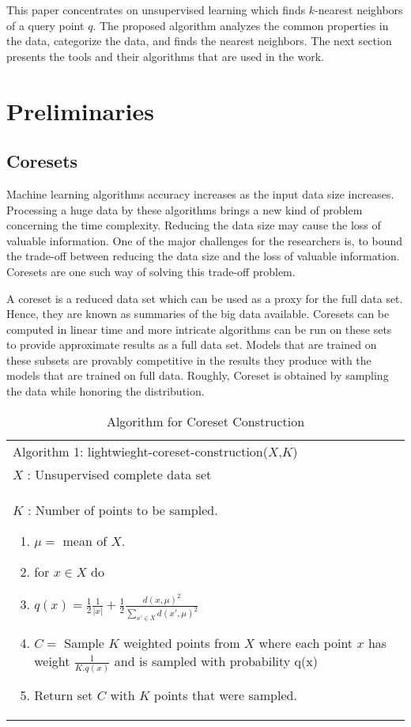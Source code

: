 \documentclass[runningheads]{llncs}
\begin{document}
This paper concentrates on unsupervised learning which finds $k$-nearest neighbors\cite{J.L.Bentley1} of a query point $q$.   The proposed algorithm analyzes the common properties in the data, categorize the data, and finds the nearest neighbors. The next section presents the tools and their algorithms that are used in the work.

\section{Preliminaries}
\label{sec:2}
\subsection{Coresets}
\label{subsec:1}
Machine learning algorithms accuracy increases as the input data size increases. Processing a huge data by these algorithms brings a new kind of problem concerning the time complexity. Reducing the data size may cause the loss of valuable information. One of the major challenges for the researchers is, to bound the trade-off between reducing the data size and the loss of valuable information. Coresets are one such way of solving this trade-off problem.

A coreset is a reduced data set which can be used as a proxy for the full data set. Hence, they are known as summaries of the big data available\cite{Olivier Bachem}. Coresets can be computed in linear time and more intricate algorithms can be run on these sets to provide approximate results as a full data set. Models that are trained on these subsets are provably competitive in the results they produce with the models that are trained on full data. Roughly, Coreset is obtained by sampling the data while honoring the distribution.

\begin{table}[!hbt]
	\caption{Algorithm for Coreset Construction}
	\label{tab:1}   
	\begin{tabular}{p{11cm}}
		\hline\noalign{\smallskip}
		Algorithm 1: lightwieght-coreset-construction($X$,$K$)\\
		\noalign{\smallskip}\hline
		$X$ : Unsupervised complete data set\\
		$K$ : Number of points to be sampled.
		\begin{enumerate}
			\item{$\mu =$ mean of $X$.}
			\item{for $x \in X$ do}
			\item[    ]{$q(x)=\frac{1}{2} \frac{1}{|x|} + \frac{1}{2} \frac{d(x,\mu)^2}{\sum_{x'\in X}d(x',\mu)^2}$}
			\item{$C =$ Sample $K$ weighted points from $X$ where each point $x$ has weight $\frac{1}{K.q(x)}$ and is sampled with probability q(x)}
			\item{Return set $C$ with $K$ points that were sampled.}
		\end{enumerate}\\
		\hline
	\end{tabular}
\end{table}
\end{document}
